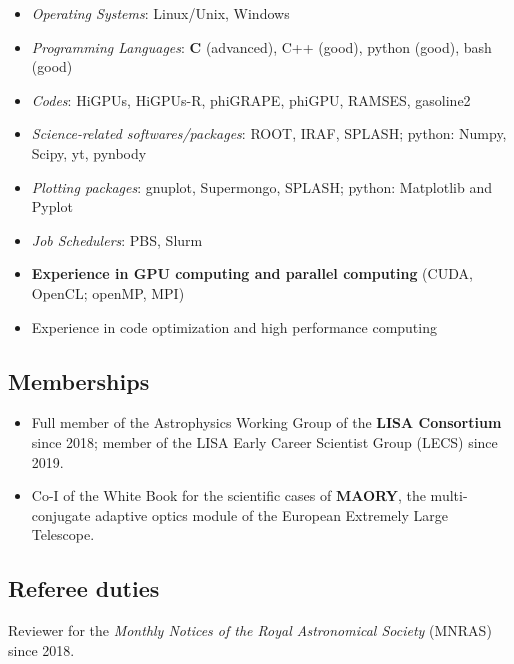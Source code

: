 \documentclass[11pt,a4paper]{article}
\begin{document}
\begin{itemize}

    \item\textit{Operating Systems}: Linux/Unix, Windows

    \item\textit{Programming Languages}: {\bf C } (advanced), C++ (good), python (good), bash (good)
    \item \textit{Codes}: HiGPUs, HiGPUs-R, phiGRAPE, phiGPU, RAMSES, gasoline2

    \item\textit{Science-related softwares/packages}: ROOT, IRAF, SPLASH; python: Numpy, Scipy, yt, pynbody

    \item\textit{Plotting packages}: gnuplot, Supermongo, SPLASH; python: Matplotlib and Pyplot 
    
    \item\textit{Job Schedulers}: PBS, Slurm
    
    \item\textbf{Experience in GPU computing and parallel computing} (CUDA, OpenCL; openMP, MPI)
    
    \item Experience in code optimization and high performance computing 

\end{itemize}

\subsection*{Memberships}

\begin{itemize}

    \item Full member of the {Astrophysics Working Group} of the {\bf LISA Consortium} since 2018; member of the LISA Early Career Scientist Group (LECS) since 2019.

    \item Co-I of the White Book for the scientific cases of  \textbf{MAORY}, the multi-conjugate adaptive optics module of the European Extremely Large Telescope.
    
\end{itemize}


\subsection*{Referee duties}
Reviewer for the {\it Monthly Notices of the Royal Astronomical Society} (MNRAS) since 2018.
\end{document}
